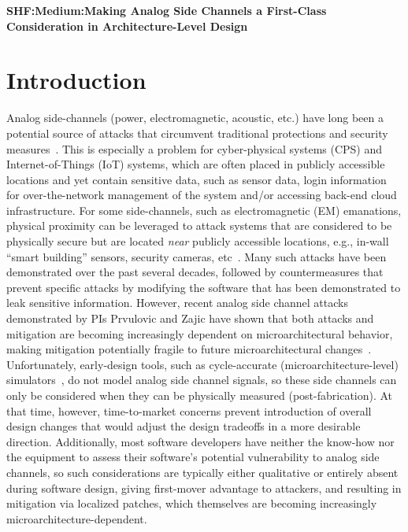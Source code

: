 \documentclass[11 pt]{article}
\begin{document}
\begin{center}
{\Large \textbf{SHF:Medium:Making Analog Side Channels a First-Class Consideration in Architecture-Level Design}}
\end{center}

\section{Introduction}
Analog side-channels (power, electromagnetic, acoustic, etc.) have long been a potential source of attacks that circumvent traditional protections and security measures~\cite{217605,Backes:2010:ASA:1929820.1929847,Balasch2015DPABA,10.1007/978-3-319-66787-4_27,4812164,Chari:2002:TA:648255.752740,Genkin:2016:EKE:2976749.2978353}. This is especially a problem for cyber-physical systems (CPS) and Internet-of-Things (IoT) systems, which are often placed in publicly accessible locations
and yet contain sensitive data, such as sensor data, login information for over-the-network management of the system and/or accessing back-end cloud infrastructure.
For some side-channels, such as electromagnetic (EM) emanations, physical proximity can be leveraged to attack systems that are considered to be physically secure but are located {\em near} publicly accessible locations, e.g., in-wall ``smart building'' sensors, security cameras, etc~\cite{10.1007/978-3-662-48324-4_11,6766222,Camurati:2018:SCE:3243734.3243802,8574570}.
Many such attacks have been demonstrated over the past several decades, followed by countermeasures that prevent specific attacks by modifying the software that has been demonstrated to leak sensitive information. However, recent analog side channel attacks demonstrated by PIs Prvulovic and Zajic have shown that both attacks and mitigation are becoming increasingly dependent on microarchitectural behavior, making mitigation potentially fragile to future microarchitectural changes~\cite{217605,Monjur21}.
Unfortunately, early-design tools, such as cycle-accurate (microarchitecture-level) simulators~\cite{Li:2009:MIP:1669112.1669172,Li:2011:CAM:2132325.2132479,509850,Ardestani:2013:EFM:2495252.2495480,Binkert:2011:GS:2024716.2024718,sesc,5982026,carlson2014aeohmcm}, do not model analog side channel signals, so these side channels can only be considered when they can be physically measured (post-fabrication). At that time, however, time-to-market concerns prevent introduction of overall design changes that would adjust the design tradeoffs in a more desirable direction. Additionally, most software developers have neither the know-how nor the equipment to assess their software’s potential vulnerability to analog side channels, so such considerations are typically either qualitative or entirely absent during software design, giving first-mover advantage to attackers, and resulting in mitigation via localized patches, which themselves are becoming increasingly microarchitecture-dependent.
\end{document}
